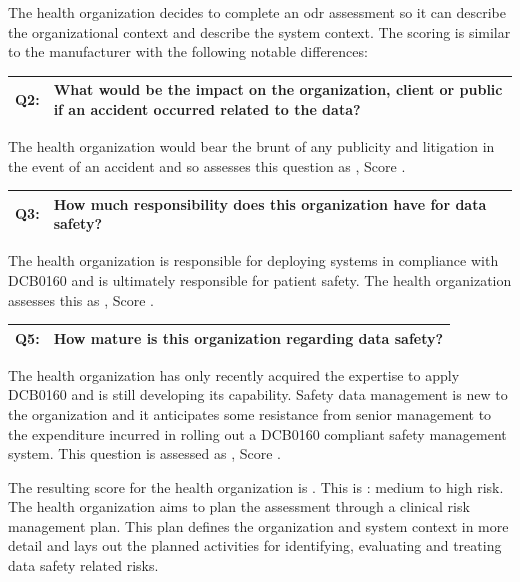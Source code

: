 The health organization decides to complete an \gls{odr} assessment
so it can describe the organizational context and describe the system context. The scoring is similar to the manufacturer with the following notable differences:

\addtocounter{table}{-1} %
\begin{longtable*}[H]
	{|L{}|L{}|}
	\hline
	Q2: & What would be the impact on the organization, client or public if an accident occurred related to the data?\\
	\hline
\end{longtable*}

The health organization would bear the brunt of any publicity and litigation in the event of an accident and so assesses this question as , Score .

\addtocounter{table}{-1} %
\begin{longtable*}[H]
	{|L{}|L{}|}
	\hline
	Q3: & How much responsibility does this organization have for data safety?\\
	\hline
\end{longtable*}

The health organization is responsible for deploying systems in compliance with
DCB0160 \cite{citation:dcb0160clinical}
and is ultimately responsible for patient safety. The health organization assesses this as , Score .

\addtocounter{table}{-1} %
\begin{longtable*}[H]
	{|L{}|L{}|}
	\hline
	Q5: & How mature is this organization regarding data safety?\\
	\hline
\end{longtable*}

The health organization has only recently acquired the expertise to apply
DCB0160
and is still developing its capability. Safety data management is new to the organization and it anticipates some resistance from senior management to the expenditure incurred in rolling out a DCB0160 compliant safety management system. This question is assessed as , Score .

The resulting score for the health organization is . This is : medium to high risk.
The health organization aims to plan the assessment through a clinical risk management plan. This plan defines the organization and system context in more detail and lays out the planned activities for identifying, evaluating and treating data safety related risks.

